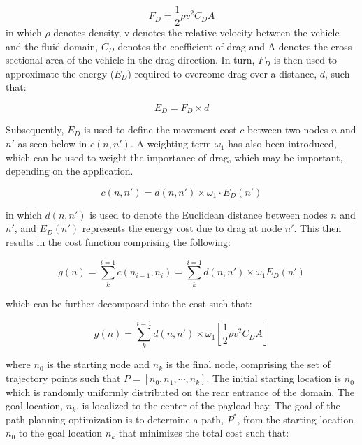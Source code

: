 \documentclass[final,5p,times,twocolumn]{elsarticle}
\begin{document}
\begin{equation}
    \label{eqn:DragForce}
    F_{D}=\frac{1}{2} \rho v^{2} C_{D} A
\end{equation}
\noindent in which $\rho$ denotes density, v denotes the relative velocity between the vehicle and the fluid domain, $C_D$  denotes the coefficient of drag and A denotes the cross-sectional area of the vehicle in the drag direction. In turn, $F_{D}$ is then used to approximate the energy ($E_D$) required to overcome drag over a distance, $d$, such that:

\begin{equation}
    \label{eqn:DragEnergy}
    E_{D} = F_{D} \times d
\end{equation}

Subsequently, $E_{D}$ is used to define the movement cost $c$ between two nodes $n$ and $n'$ as seen below in $c(n, n')$. A weighting term $\omega_{1}$ has also been introduced, which can be used to weight the importance of drag, which may be important, depending on the application. 

\begin{equation}
    \label{eqn:NodeCost}
    c(n, n') = d(n, n') \times \omega_{1} \cdot E_{D}(n')
\end{equation}

\noindent in which $d(n,n')$ is used to denote the Euclidean distance between nodes $n$ and $n'$, and $E_D (n')$ represents the energy cost due to drag at node $n'$. This then results in the cost function comprising the following:

\begin{equation}
    \label{eqn:CostFunction}
    g(n) = \sum_{k}^{i=1} c(n_{i-1}, n_{i}) = \sum_{k}^{i=1} d(n, n') \times \omega_{1} E_{D} (n')
\end{equation}

\noindent which can be further decomposed into the cost such that:

\begin{equation}
    \label{eqn:CostFunction2}
    g(n) = \sum_{k}^{i=1} d(n, n') \times \omega_{1} \left [ \frac{1}{2} \rho v^{2} C_D A \right ]
\end{equation}

\noindent where $n_0$ is the starting node and $n_k$ is the final node, comprising the set of trajectory points such that $P=[n_0,n_1,\cdots,n_k]$. The initial starting location is $n_0$ which is randomly uniformly distributed on the rear entrance of the domain. The goal location, $n_k$, is localized to the center of the payload bay. The goal of the path planning optimization is to determine a path, $P^*$, from the starting location $n_0$ to the goal location $n_k$ that minimizes the total cost such that:
\end{document}
